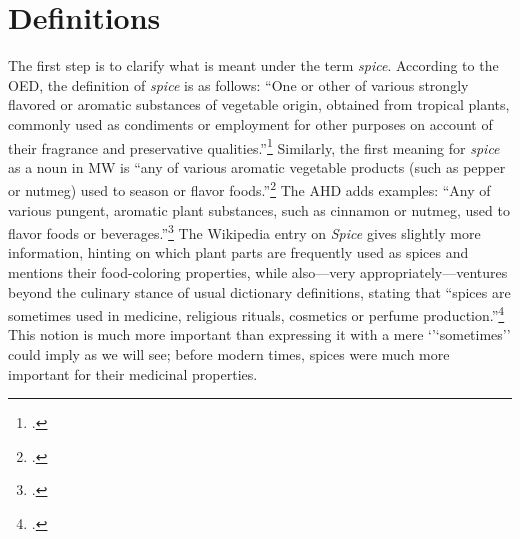 


\section{Definitions}
\label{sec:definitions}

The first step is to clarify what is meant under the term \textit{spice}. According to the \gls{OED}, the definition of \textit{spice} is as follows: ``One or other of various strongly flavored or aromatic substances of vegetable origin, obtained from tropical plants, commonly used as condiments or employment for other purposes on account of their fragrance and preservative qualities.''\footcite[spice]{oed} Similarly, the first meaning for \textit{spice} as a noun in \gls{MW} is ``any of various aromatic vegetable products (such as pepper or nutmeg) used to season or flavor foods.''\footcite[spice]{mw} The \gls{AHD} adds examples: ``Any of various pungent, aromatic plant substances, such as cinnamon or nutmeg, used to flavor foods or beverages.''\footcite[spice]{ahd} 
The Wikipedia entry on \textit{Spice} gives slightly more information, hinting on which plant parts are frequently used as spices and mentions their food-coloring properties, while also---very appropriately---ventures beyond the culinary stance of usual dictionary definitions, stating that ``spices are sometimes used in medicine, religious rituals, cosmetics or perfume production.''\footcite{wikipedia_spice_2022} This notion is much more important than expressing it with a mere `'`sometimes'' could imply as we will see; before modern times, spices were much more important for their medicinal properties.

